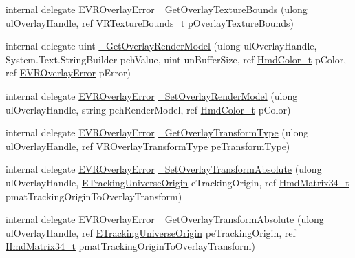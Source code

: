 \begin{DoxyCompactItemize}
\item 
internal delegate \mbox{\hyperlink{namespace_valve_1_1_v_r_aaee5c5144f42b7969d45b854f51b0c18}{E\+V\+R\+Overlay\+Error}} \mbox{\hyperlink{struct_valve_1_1_v_r_1_1_i_v_r_overlay_afae80e32021ddd3855f12f12aa5a0022}{\+\_\+\+Get\+Overlay\+Texture\+Bounds}} (ulong ul\+Overlay\+Handle, ref \mbox{\hyperlink{struct_valve_1_1_v_r_1_1_v_r_texture_bounds__t}{V\+R\+Texture\+Bounds\+\_\+t}} p\+Overlay\+Texture\+Bounds)
\item 
internal delegate uint \mbox{\hyperlink{struct_valve_1_1_v_r_1_1_i_v_r_overlay_a97891b66fe3f14691f4eb8f6642ad5ef}{\+\_\+\+Get\+Overlay\+Render\+Model}} (ulong ul\+Overlay\+Handle, System.\+Text.\+String\+Builder pch\+Value, uint un\+Buffer\+Size, ref \mbox{\hyperlink{struct_valve_1_1_v_r_1_1_hmd_color__t}{Hmd\+Color\+\_\+t}} p\+Color, ref \mbox{\hyperlink{namespace_valve_1_1_v_r_aaee5c5144f42b7969d45b854f51b0c18}{E\+V\+R\+Overlay\+Error}} p\+Error)
\item 
internal delegate \mbox{\hyperlink{namespace_valve_1_1_v_r_aaee5c5144f42b7969d45b854f51b0c18}{E\+V\+R\+Overlay\+Error}} \mbox{\hyperlink{struct_valve_1_1_v_r_1_1_i_v_r_overlay_a1bbe01ba8283e551d3d818e31199e39b}{\+\_\+\+Set\+Overlay\+Render\+Model}} (ulong ul\+Overlay\+Handle, string pch\+Render\+Model, ref \mbox{\hyperlink{struct_valve_1_1_v_r_1_1_hmd_color__t}{Hmd\+Color\+\_\+t}} p\+Color)
\item 
internal delegate \mbox{\hyperlink{namespace_valve_1_1_v_r_aaee5c5144f42b7969d45b854f51b0c18}{E\+V\+R\+Overlay\+Error}} \mbox{\hyperlink{struct_valve_1_1_v_r_1_1_i_v_r_overlay_a99fe5b9dbb9381067659cb1c5e5a1cd9}{\+\_\+\+Get\+Overlay\+Transform\+Type}} (ulong ul\+Overlay\+Handle, ref \mbox{\hyperlink{namespace_valve_1_1_v_r_a92803c040c9ae49e1263b22b4d57d5fb}{V\+R\+Overlay\+Transform\+Type}} pe\+Transform\+Type)
\item 
internal delegate \mbox{\hyperlink{namespace_valve_1_1_v_r_aaee5c5144f42b7969d45b854f51b0c18}{E\+V\+R\+Overlay\+Error}} \mbox{\hyperlink{struct_valve_1_1_v_r_1_1_i_v_r_overlay_a3c03a5b1bb15a5be4bc66a4cfeea8ebb}{\+\_\+\+Set\+Overlay\+Transform\+Absolute}} (ulong ul\+Overlay\+Handle, \mbox{\hyperlink{namespace_valve_1_1_v_r_a29be99a3c2f780157bd490db06a7f12f}{E\+Tracking\+Universe\+Origin}} e\+Tracking\+Origin, ref \mbox{\hyperlink{struct_valve_1_1_v_r_1_1_hmd_matrix34__t}{Hmd\+Matrix34\+\_\+t}} pmat\+Tracking\+Origin\+To\+Overlay\+Transform)
\item 
internal delegate \mbox{\hyperlink{namespace_valve_1_1_v_r_aaee5c5144f42b7969d45b854f51b0c18}{E\+V\+R\+Overlay\+Error}} \mbox{\hyperlink{struct_valve_1_1_v_r_1_1_i_v_r_overlay_a1a1ee40ba7c9c9826b3646ded3df209f}{\+\_\+\+Get\+Overlay\+Transform\+Absolute}} (ulong ul\+Overlay\+Handle, ref \mbox{\hyperlink{namespace_valve_1_1_v_r_a29be99a3c2f780157bd490db06a7f12f}{E\+Tracking\+Universe\+Origin}} pe\+Tracking\+Origin, ref \mbox{\hyperlink{struct_valve_1_1_v_r_1_1_hmd_matrix34__t}{Hmd\+Matrix34\+\_\+t}} pmat\+Tracking\+Origin\+To\+Overlay\+Transform)

\end{DoxyCompactItemize}
